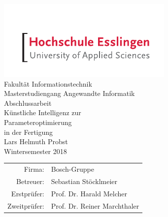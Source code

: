 





\begin{titlepage}
    \begin{center}
        \includegraphics[scale=2.5]{images/he_logo.pdf}\\
        \vspace{1cm} Fakultät Informationstechnik\\Masterstudiengang Angewandte Informatik\\
        \vspace{1.5cm} \Large Abschlussarbeit\\
        \vspace{1.5cm} \Huge Künstliche Intelligenz zur \\ Parameteroptimierung \\ in der Fertigung\\
        \vspace{1.5cm} \Large Lars Helmuth Probst\\\normalsize
        \vspace{0.5cm} Wintersemester 2018\\\normalsize
        \vfill{}
        \begin{tabular}{rl}
            Firma: & Bosch-Gruppe\\[0.5cm]
            Betreuer: & Sebastian Stöcklmeier\\[0.5cm]
            Erstprüfer: & Prof. Dr. Harald Melcher\\[0.5cm]
            Zweitprüfer: & Prof. Dr. Reiner Marchthaler
        \end{tabular}
    \end{center}
\end{titlepage}

